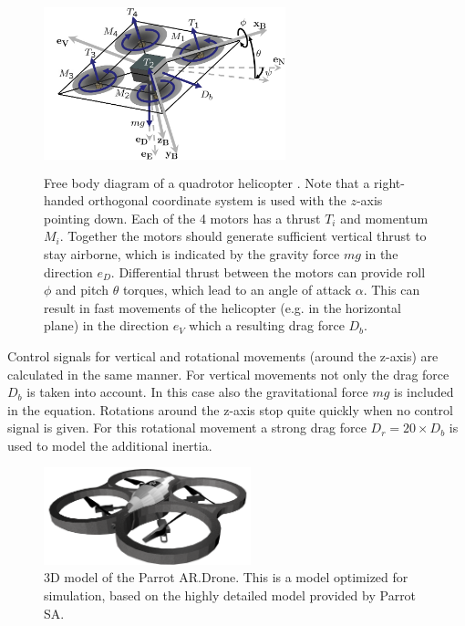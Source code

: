 \begin{figure}[htb]
\centering
\includegraphics[width=7cm, height=5cm]{images/QuadRotorBody.png}
\caption{Free body diagram of a quadrotor helicopter 
\cite{Hoffmann2007}. Note that a right-handed orthogonal coordinate system is used with the $z$-axis pointing down. Each of the 4 motors has a thrust $T_i$ and momentum $M_i$. Together the motors should generate sufficient vertical thrust to stay airborne, which is indicated by the gravity force $mg$ in the direction $e_D$. Differential thrust between the motors can provide roll $\phi$ and pitch  $\theta$ torques, which lead to an angle of attack $\alpha$. This can result in fast movements of the helicopter (e.g. in the horizontal plane) in the direction $e_V$ which a resulting drag force $D_b$. }
\label{fig:QuadRotorBody}
\end{figure}

Control signals for vertical and rotational movements (around the z-axis) are calculated in the same manner. For vertical movements not only the drag force $D_b$ is taken into account. In this case also the gravitational force $mg$ is included in the equation. Rotations around the z-axis stop quite quickly when no control signal is given. For this rotational movement a strong drag force $D_r = 20 \times D_b$ is used to model the additional inertia. 

\begin{figure}[htb!]
\centering
\includegraphics[width=6cm]{images/ardrone_blender_final.png}
\caption{3D model of the Parrot AR.Drone. This is a model optimized for simulation, based on the highly detailed model provided by Parrot SA.} 
\label{fig:3Dmodel}
\end{figure}

